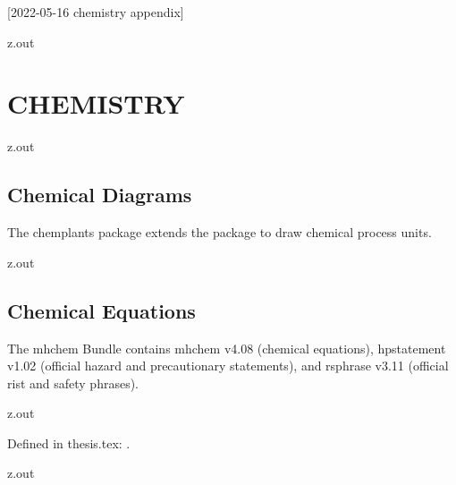 [2022-05-16 chemistry appendix]

\begin{VerbatimOut}{z.out}
\chapter{CHEMISTRY}
\label{ch:chemistry}


\end{VerbatimOut}

\MyIO


\begin{VerbatimOut}{z.out}


\section{Chemical Diagrams}

The chemplants package
\cite{feffin2019}
extends the
\href{http://ctan.math.washington.edu/tex-archive/graphics/pgf/base/doc/pgfmanual.pdf}{\TikZLogo}
package
to draw chemical process units.
\end{VerbatimOut}

\MyIO


\begin{VerbatimOut}{z.out}


\section{Chemical Equations}

The mhchem Bundle
\cite{hensel2018}
contains mhchem v4.08 (chemical equations),
hpstatement v1.02 (official hazard and precautionary statements),
and rsphrase v3.11 (official rist and safety phrases).
\end{VerbatimOut}

\MyIO


\begin{VerbatimOut}{z.out}

Defined in thesis.tex: \nitrate.
\end{VerbatimOut}

\MyIO


\begin{VerbatimOut}{z.out}

\end{VerbatimOut}

